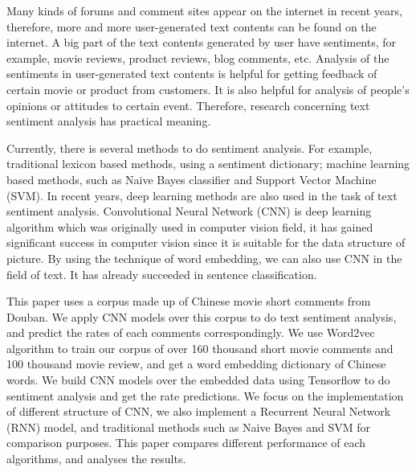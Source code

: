 \begin{enabstract}
Many kinds of forums and comment sites appear on the internet in recent years, therefore, more and more user-generated text contents can be found on the internet. A big part of the text contents generated by user have sentiments, for example, movie reviews, product reviews, blog comments, etc. Analysis of the sentiments in user-generated text contents is helpful for getting feedback of certain movie or product from customers. It is also helpful for analysis of people's opinions or attitudes to certain event. Therefore, research concerning text sentiment analysis has practical meaning.

Currently, there is several methods to do sentiment analysis. For example, traditional lexicon based methods, using a sentiment dictionary; machine learning based methods, such as Naive Bayes classifier and Support Vector Machine (SVM). In recent years, deep learning methods are also used in the task of text sentiment analysis. Convolutional Neural Network (CNN) is deep learning algorithm which was originally used in computer vision field, it has gained significant success in computer vision since it is suitable for the data structure of picture. By using the technique of word embedding, we can also use CNN in the field of text. It has already succeeded in sentence classification.

This paper uses a corpus made up of Chinese movie short comments from Douban. We apply CNN models over this corpus to do text sentiment analysis, and predict the rates of each comments correspondingly. We use Word2vec algorithm to train our corpus of over 160 thousand short movie comments and 100 thousand movie review, and get a word embedding dictionary of Chinese words. We build CNN models over the embedded data using Tensorflow to do sentiment analysis and get the rate predictions. We focus on the implementation of different structure of CNN, we also implement a Recurrent Neural Network (RNN) model, and traditional methods such as Naive Bayes and SVM for comparison purposes. This paper compares different performance of each algorithms, and analyses the results.

\end{enabstract}
